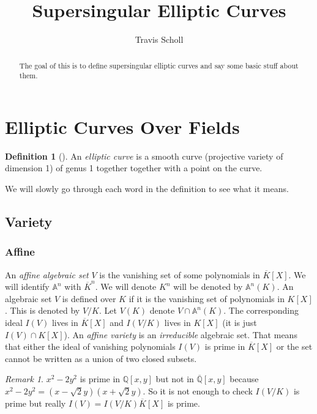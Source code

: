 \documentclass[11pt]{article}
\newcommand{\mytitle}{Supersingular Elliptic Curves}
\newcommand{\myauthor}{Travis Scholl}
\newcommand{\BB}[1]{\mathbb{#1}} %
\newcommand{\QQ}{\BB{Q}}
\renewcommand{\AA}{\BB{A}} %
\theoremstyle{plain}%
\theoremstyle{definition}
\newtheorem{defn}[thm]{Definition}
\theoremstyle{remark}
\newtheorem{rem}[thm]{Remark}
\begin{document}
\title{\bfseries\mytitle}  
\author{\sc \myauthor }
\maketitle

\begin{abstract}
	The goal of this is to define supersingular elliptic curves and say some basic stuff about them.
\end{abstract}

\section{Elliptic Curves Over Fields}

\begin{defn}[{\cite[III.3, p 59]{silverman1}}]
	An \emph{elliptic curve} is a smooth curve (projective variety of dimension 1) of genus 1 together together with a point on the curve.
\end{defn}

We will slowly go through each word in the definition to see what it means.

\subsection{Variety}

\subsubsection{Affine}

An \emph{affine algebraic set} $V$ is the vanishing set of some polynomials in $\overline{K}[X]$. We will identify $\AA^n$ with $\overline{K}^n$. We will denote $K^n$ will be denoted by $\AA^n(K)$. An algebraic set $V$ is defined over $K$ if it is the vanishing set of polynomials in $K[X]$. This is denoted by $V/K$. Let $V(K)$ denote $V \cap\AA^n(K)$. The corresponding ideal $I(V)$ lives in $\overline{K}[X]$ and $I(V/K)$ lives in $K[X]$ (it is just $I(V)\cap K[X]$). An \emph{affine variety} is an \emph{irreducible} algebraic set. That means that either the ideal of vanishing polynomials $I(V)$ is prime in $\overline{K}[X]$ or the set cannot be written as a union of two closed subsets.

\begin{rem}
	$x^2-2y^2$ is prime in $\QQ[x,y]$ but not in $\overline{\QQ}[x,y]$ because $x^2-2y^2 = (x-\sqrt{2}y)(x+\sqrt{2}y)$. So it is not enough to check $I(V/K)$ is prime but really $I(V) = I(V/K)\overline{K}[X]$ is prime.
\end{rem}
\end{document}
